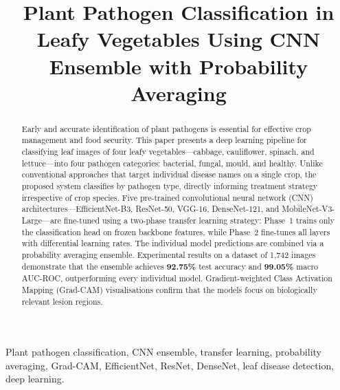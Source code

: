 \documentclass[conference]{IEEEtran}
\begin{document}
\title{Plant Pathogen Classification in Leafy Vegetables Using CNN Ensemble with Probability Averaging}

\author{
}

\maketitle

\begin{abstract}
Early and accurate identification of plant pathogens is essential for effective crop management and food security. This paper presents a deep learning pipeline for classifying leaf images of four leafy vegetables---cabbage, cauliflower, spinach, and lettuce---into four pathogen categories: bacterial, fungal, mould, and healthy. Unlike conventional approaches that target individual disease names on a single crop, the proposed system classifies by pathogen type, directly informing treatment strategy irrespective of crop species. Five pre-trained convolutional neural network (CNN) architectures---EfficientNet-B3, ResNet-50, VGG-16, DenseNet-121, and MobileNet-V3-Large---are fine-tuned using a two-phase transfer learning strategy: Phase~1 trains only the classification head on frozen backbone features, while Phase~2 fine-tunes all layers with differential learning rates. The individual model predictions are combined via a probability averaging ensemble. Experimental results on a dataset of 1,742 images demonstrate that the ensemble achieves \textbf{92.75\%} test accuracy and \textbf{99.05\%} macro AUC-ROC, outperforming every individual model. Gradient-weighted Class Activation Mapping (Grad-CAM) visualisations confirm that the models focus on biologically relevant lesion regions.
\end{abstract}

\begin{IEEEkeywords}
Plant pathogen classification, CNN ensemble, transfer learning, probability averaging, Grad-CAM, EfficientNet, ResNet, DenseNet, leaf disease detection, deep learning.
\end{IEEEkeywords}
\end{document}
